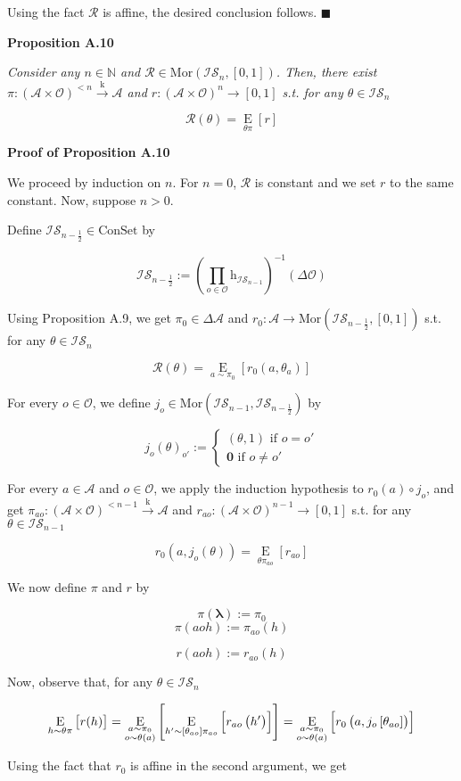 \documentclass[a4paper]{article}
\newcommand{\Co}[1]{}
\newcommand{\AP}[1]{\left(#1\right)}
\newcommand{\AB}[1]{\left[#1\right]}
\newcommand{\Ea}[2]{\underset{#1}{\operatorname{E}}\AB{#2}}
\newcommand{\Nats}{\mathbb{N}}
\newcommand{\Mor}{\mathrm{Mor}}
\newcommand{\K}{\xrightarrow{\mathrm{k}}}
\newcommand{\Estr}{\boldsymbol{\lambda}} %
\newcommand{\A}{\mathcal{A}}
\newcommand{\Ob}{\mathcal{O}}
\newcommand{\AO}{\AP{\A\times\Ob}}
\newcommand{\R}{\mathcal{R}}
\newcommand{\Con}{{\boldsymbol{\mathrm{ConSet}}}}
\newcommand{\Ht}{\mathrm{h}}
\newcommand{\IS}{\mathcal{IS}}
\begin{document}
Using the fact $\R$ is affine, the desired conclusion follows. $\blacksquare$

\textbf{Proposition A.10}\Co{b}

\textit{Consider any $n\in\Nats$ and $\R\in\Mor\AP{\IS_n,[0,1]}$. Then, there exist $\pi:\AO^{<n}\K\A$ and $r:\AO^n\rightarrow[0,1]$ s.t. for any $\theta\in\IS_n$}\Co{i}

$$\R(\theta)=\Ea{\theta\pi}{r}$$

\textbf{Proof of Proposition A.10}\Co{b}

We proceed by induction on $n$. For $n=0$, $\R$ is constant and we set $r$ to the same constant. Now, suppose $n>0$.

Define $\IS_{n-\frac{1}{2}}\in\Con$ by

$$\IS_{n-\frac{1}{2}}:=\AP{\prod_{o\in\Ob}\Ht_{\IS_{n-1}}}^{-1}(\Delta\Ob)$$

Using Proposition A.9, we get $\pi_0\in\Delta\A$ and $r_0:\A\rightarrow\Mor\AP{\IS_{n-\frac{1}{2}},[0,1]}$ s.t. for any $\theta\in\IS_n$

$$\R(\theta)=\Ea{a\sim\pi_0}{r_0\AP{a,\theta_a}}$$

For every $o\in\Ob$, we define $j_o\in\Mor\AP{\IS_{n-1},\IS_{n-\frac{1}{2}}}$ by

$$j_o(\theta)_{o'}:=\begin{cases} (\theta,1) \text{ if } o=o' \\ \boldsymbol{0} \text{ if } o\ne o' \end{cases}$$

For every $a\in\A$ and $o\in\Ob$, we apply the induction hypothesis to $r_0(a)\circ j_o$, and get $\pi_{ao}:\AO^{<n-1}\K\A$ and $r_{ao}:\AO^{n-1}\rightarrow[0,1]$ s.t. for any $\theta\in\IS_{n-1}$

$$r_0\AP{a,j_o(\theta)}=\Ea{\theta\pi_{ao}}{r_{ao}}$$

We now define $\pi$ and $r$ by

$$\pi(\Estr):=\pi_0$$
$$\pi(aoh):=\pi_{ao}(h)$$

$$r(aoh):=r_{ao}(h)$$

Now, observe that, for any $\theta\in\IS_n$

$$\Ea{h\sim\theta\pi}{r(h)}=\Ea{\substack{a\sim\pi_0\\o\sim\theta(a)}}{\Ea{\\h'\sim\AB{\theta_{ao}}\pi_{ao}}{r_{ao}\AP{h'}}}=\Ea{\substack{a\sim\pi_0\\o\sim\theta(a)}}{r_0\AP{a,j_o\AB{\theta_{ao}}}}$$

Using the fact that $r_0$ is affine in the second argument, we get
\end{document}
